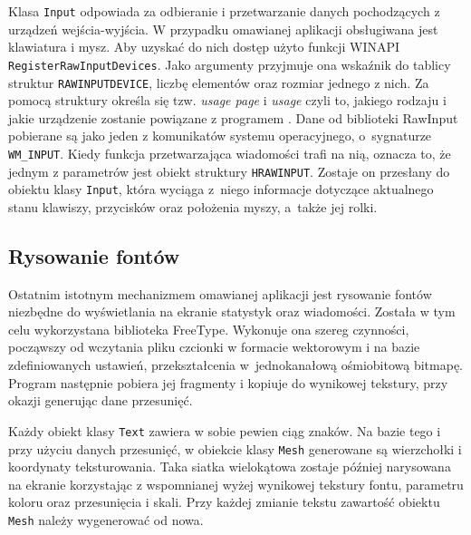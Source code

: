		
		Klasa \texttt{Input} odpowiada za odbieranie i przetwarzanie danych pochodzących z urządzeń wejścia-wyjścia. W przypadku omawianej aplikacji obsługiwana jest klawiatura i mysz. Aby uzyskać do nich dostęp użyto funkcji WINAPI \texttt{RegisterRawInputDevices}. Jako argumenty przyjmuje ona wskaźnik do tablicy struktur \texttt{RAWINPUTDEVICE}, liczbę elementów oraz rozmiar jednego z nich. Za pomocą struktury określa się tzw. \emph{usage page} i \emph{usage} czyli to, jakiego rodzaju i jakie urządzenie zostanie powiązane z programem \cite{tech03}. 
		Dane od biblioteki RawInput pobierane są jako jeden z komunikatów systemu operacyjnego, o~sygnaturze \texttt{WM\_INPUT}. Kiedy funkcja przetwarzająca wiadomości trafi na nią, oznacza to, że jednym z parametrów jest obiekt struktury \texttt{HRAWINPUT}. Zostaje on przesłany do obiektu klasy \texttt{Input}, która wyciąga z~niego informacje dotyczące aktualnego stanu klawiszy, przycisków oraz położenia myszy, a~także jej rolki.
		
		\subsection{Rysowanie fontów}
		\label{t:budowa:inne:fonty}
		
		
		Ostatnim istotnym mechanizmem omawianej aplikacji jest rysowanie fontów niezbędne do wyświetlania na ekranie statystyk oraz wiadomości. Została w tym celu wykorzystana biblioteka FreeType. Wykonuje ona szereg czynności, począwszy od wczytania pliku czcionki w formacie wektorowym i na bazie zdefiniowanych ustawień, przekształcenia w~jednokanałową ośmiobitową bitmapę. Program następnie pobiera jej fragmenty i kopiuje do wynikowej tekstury, przy okazji generując dane przesunięć.
		
		Każdy obiekt klasy \texttt{Text} zawiera w sobie pewien ciąg znaków. Na bazie tego i przy użyciu danych przesunięć, w obiekcie klasy \texttt{Mesh} generowane są wierzchołki i koordynaty teksturowania. Taka siatka wielokątowa zostaje później narysowana na ekranie korzystając z wspomnianej wyżej wynikowej tekstury fontu, parametru koloru oraz przesunięcia i skali. Przy każdej zmianie tekstu zawartość obiektu \texttt{Mesh} należy wygenerować od nowa.